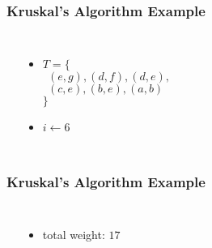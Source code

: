 \documentclass[dvipsnames]{beamer}
\begin{document}
\begin{frame}
  \frametitle{Kruskal's Algorithm Example}

  \begin{example}[$5 < 6$]
    \begin{columns}
      \begin{center}
      \end{center}

      \pause
      \begin{itemize}
        \item $T = \{$\\
          $~~(e,g), (d,f), (d,e),$\\
          $~~(c,e), (b,e), (a,b)$\\
          $\}$
        \item $i \leftarrow 6$
      \end{itemize}
    \end{columns}
  \end{example}
\end{frame}

\begin{frame}
  \frametitle{Kruskal's Algorithm Example}

  \begin{example}[$6 \nless 6$]
    \begin{columns}
      \begin{center}
      \end{center}

      \begin{itemize}
        \item total weight: $17$
      \end{itemize}
    \end{columns}
  \end{example}
\end{frame}
\end{document}
